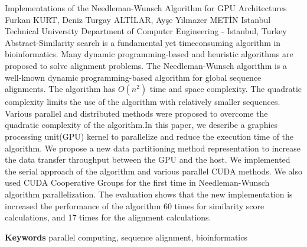 
    \begin{abstract_online}{Implementations of the Needleman-Wunsch Algorithm for GPU Architectures}{%
        Furkan KURT, Deniz Turgay ALTİLAR, Ayşe Yılmazer METİN}{%
        }{%
        Istanbul Technical University Department of Computer Engineering - Istanbul, Turkey}
    Abstract-Similarity search is a fundamental yet timeconsuming algorithm in bioinformatics. Many dynamic programming-based and heuristic algorithms are proposed to solve alignment problems. The Needleman-Wunsch algorithm is a well-known dynamic programming-based algorithm for global sequence alignments. The algorithm has $O\left(n^{2}\right)$ time and space complexity. The quadratic complexity limits the use of the algorithm with relatively smaller sequences. Various parallel and distributed methods were proposed to overcome the quadratic complexity of the algorithm.\newline In this paper, we describe a graphics processing unit(GPU) kernel to parallelize and reduce the execution time of the algorithm. We propose a new data partitioning method representation to increase the data transfer throughput between the GPU and the host. We implemented the serial approach of the algorithm and various parallel CUDA methods. We also used CUDA Cooperative Groups for the first time in Needleman-Wunsch algorithm parallelization. The evaluation shows that the new implementation is increased the performance of the algorithm 60 times for similarity score calculations, and 17 times for the alignment calculations. 
    
        \textbf{Keywords} \newline{}parallel computing, sequence alignment, bioinformatics
    \end{abstract_online}
    
